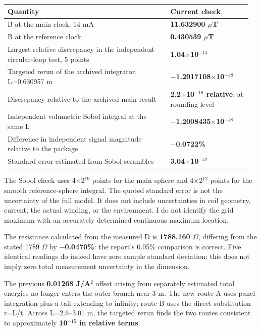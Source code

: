 \documentclass[10pt,a4paper]{article}
\begin{document}
{\begin{center}
{\begin{tabular}{@{}>{\raggedright\arraybackslash}p{0.64\linewidth}>{\raggedleft\arraybackslash}p{0.32\linewidth}@{}}
\toprule
Quantity & Current check \\
\midrule
B at the main clock, 14 mA & \textbf{11.632900 $\mu$T} \\
B at the reference clock & \textbf{0.430539 $\mu$T} \\
Largest relative discrepancy in the independent circular-loop test, 5 points & \textbf{1.04$\times$10$^{-14}$} \\
Targeted rerun of the archived integrator, L=0.630957 m & \textbf{$-$1.2017108$\times$10$^{-48}$} \\
Discrepancy relative to the archived main result & \textbf{2.2$\times$10$^{-16}$ relative}, at rounding level \\
Independent volumetric Sobol integral at the same L & \textbf{$-$1.2008435$\times$10$^{-48}$} \\
Difference in independent signal magnitude relative to the package & \textbf{$-$0.0722\%} \\
Standard error estimated from Sobol scrambles & \textbf{3.04$\times$10$^{-52}$} \\
\bottomrule\end{tabular}}\vspace{-2pt}\end{center}
\par
The Sobol check uses 4$\times$2$^{19}$ points for the main sphere and 4$\times$2$^{12}$ points for the smooth reference-sphere integral. The quoted standard error is not the uncertainty of the full model. It does not include uncertainties in coil geometry, current, the actual winding, or the environment. I do not identify the grid maximum with an accurately determined continuous maximum location.
\par
The resistance calculated from the measured D is \textbf{1788.160 $\Omega$}, differing from the stated 1789 $\Omega$ by \textbf{$-$0.0470\%}: the report's 0.05\% comparison is correct. Five identical readings do indeed have zero sample standard deviation; this does not imply zero total measurement uncertainty in the dimension.
\par
\vspace{2pt}\par\vspace{0.5pt}
\par
The previous \textbf{0.01268 J/A$^2$} offset arising from separately estimated total energies no longer enters the outer branch near 3 m. The new route A uses panel integration plus a tail extending to infinity; route B uses the direct substitution r=L/t. Across L=2.6--3.01 m, the targeted rerun finds the two routes consistent to approximately \textbf{10$^{-15}$ in relative terms}.
}
\end{document}
